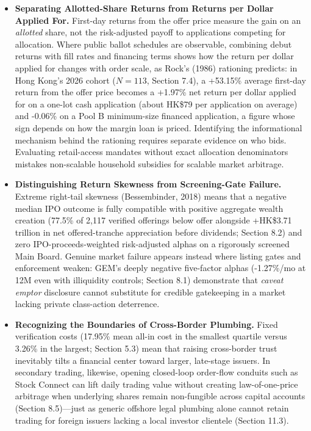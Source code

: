 \documentclass[11pt,letterpaper]{article}
\begin{document}
\begin{itemize}
\item \textbf{Separating Allotted-Share Returns from Returns per Dollar Applied For.} First-day returns from the offer price measure the gain on an \textit{allotted} share, not the risk-adjusted payoff to applications competing for allocation. Where public ballot schedules are observable, combining debut returns with fill rates and financing terms shows how the return per dollar applied for changes with order scale, as Rock's (1986) rationing predicts: in Hong Kong's 2026 cohort ($N = 113$, Section 7.4), a +53.15\% average first-day return from the offer price becomes a +1.97\% net return per dollar applied for on a one-lot cash application (about HK\$79 per application on average) and -0.06\% on a Pool B minimum-size financed application, a figure whose sign depends on how the margin loan is priced. Identifying the informational mechanism behind the rationing requires separate evidence on who bids. Evaluating retail-access mandates without exact allocation denominators mistakes non-scalable household subsidies for scalable market arbitrage.
\item \textbf{Distinguishing Return Skewness from Screening-Gate Failure.} Extreme right-tail skewness (Bessembinder, 2018) means that a negative median IPO outcome is fully compatible with positive aggregate wealth creation (77.5\% of 2,117 verified offerings below offer alongside +HK\$3.71 trillion in net offered-tranche appreciation before dividends; Section 8.2) and zero IPO-proceeds-weighted risk-adjusted alphas on a rigorously screened Main Board. Genuine market failure appears instead where listing gates and enforcement weaken: GEM's deeply negative five-factor alphas (-1.27\%/mo at 12M even with illiquidity controls; Section 8.1) demonstrate that \textit{caveat emptor} disclosure cannot substitute for credible gatekeeping in a market lacking private class-action deterrence.
\item \textbf{Recognizing the Boundaries of Cross-Border Plumbing.} Fixed verification costs (17.95\% mean all-in cost in the smallest quartile versus 3.26\% in the largest; Section 5.3) mean that raising cross-border trust inevitably tilts a financial center toward larger, late-stage issuers. In secondary trading, likewise, opening closed-loop order-flow conduits such as Stock Connect can lift daily trading value without creating law-of-one-price arbitrage when underlying shares remain non-fungible across capital accounts (Section 8.5)—just as generic offshore legal plumbing alone cannot retain trading for foreign issuers lacking a local investor clientele (Section 11.3).
\end{itemize}
\end{document}

